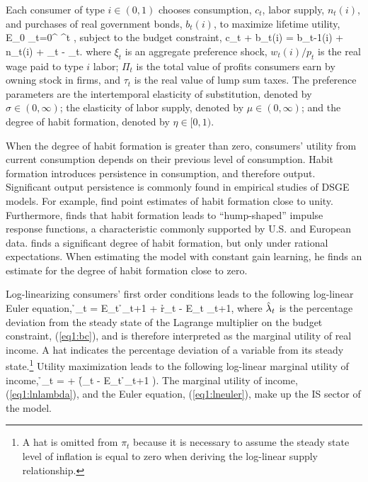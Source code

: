 Each consumer of type $i\in(0,1)$ chooses consumption, $c_t$, labor supply, $n_t(i)$, and purchases of real government bonds, $b_{t}(i)$, to maximize lifetime utility,
\beq \label{eq1:util} E_0 \sum_{t=0}^{\infty} \beta^t , \eeq
subject to the budget constraint, 
\beq \label{eq1:bc} c_t + b_t(i) =  b_{t-1}(i) +  n_t(i) + \Pi_t - \tau_t. \eeq
where $\xi_t$ is an aggregate preference shock, $w_t(i)/p_t$ is the real wage paid to type $i$ labor; $\Pi_t$ is the total value of profits consumers earn by owning stock in firms, and $\tau_t$ is the real value of lump sum taxes.  The preference parameters are the intertemporal elasticity of substitution, denoted by $\sigma \in (0,\infty)$; the elasticity of labor supply, denoted by $\mu \in (0, \infty)$; and the degree of habit formation, denoted by $\eta \in [0,1)$.

When the degree of habit formation is greater than zero, consumers' utility from current consumption depends on their previous level of consumption.  Habit formation introduces persistence in consumption, and therefore output.  Significant output persistence is commonly found in empirical studies of DSGE models.  For example,  find point estimates of habit formation close to unity.  Furthermore,  finds that habit formation leads to ``hump-shaped'' impulse response functions, a characteristic commonly supported by U.S. and European data.   finds a significant degree of habit formation, but only under rational expectations.  When estimating the model with constant gain learning, he finds an estimate for the degree of habit formation close to zero.   

Log-linearizing consumers' first order conditions leads to the following log-linear Euler equation,
\beq \label{eq1:lneuler} \h{\lambda}_{t} = E_t \h{\lambda}_{t+1} + \h{r}_t - E_t \pi_{t+1}, \eeq
where $\hat{\lambda}_t$ is the percentage deviation from the steady state of the Lagrange multiplier on the budget constraint, (\ref{eq1:bc}), and is therefore interpreted as the marginal utility of real income.  A hat indicates the percentage deviation of a variable from its steady state.\footnote{A hat is omitted from $\pi_t$ because it is necessary to assume the steady state level of inflation is equal to zero when deriving the log-linear supply relationship.}  Utility maximization leads to the following log-linear marginal utility of income,
\beq \label{eq1:lnlambda} \h{\lambda}_t =  + \left(\h{\xi}_t - \beta \eta E_t \h{\xi}_{t+1} \right). \eeq
The marginal utility of income, (\ref{eq1:lnlambda}), and the Euler equation, (\ref{eq1:lneuler}), make up the IS sector of the model.

